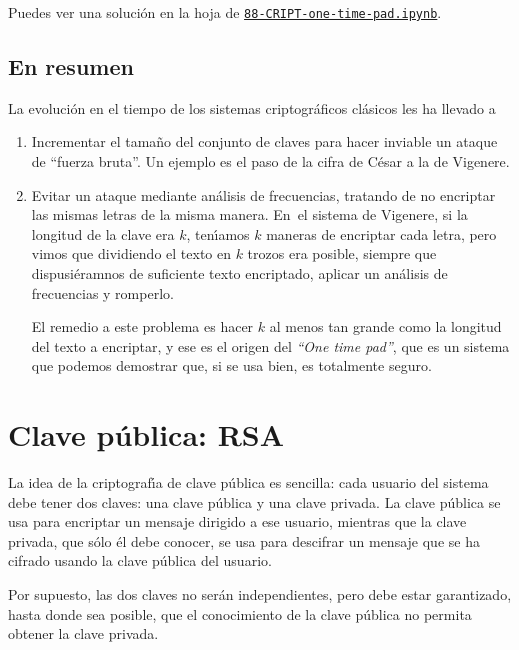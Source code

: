  Puedes ver una soluci\'on en la hoja de {\sage} 
 \href{http://localhost:8888/notebooks/CRIPT/??}{\tt 88-CRIPT-one-time-pad.ipynb}.
 
 \subsection{En resumen}
 
 La evoluci\'on en el tiempo de los sistemas criptogr\'aficos cl\'asicos les ha
llevado a
 \begin{enumerate}
  \item Incrementar el tama\~no del conjunto de claves para
hacer inviable un ataque de ``fuerza bruta''. Un ejemplo es el paso de la cifra
de C\'esar a la  de Vigenere. 

\item Evitar un ataque mediante an\'alisis de frecuencias, tratando de no
encriptar las mismas letras de la misma manera.  En~el sistema de  Vigenere, si
la longitud de la clave era $k$, ten\'{\i}amos $k$ maneras de encriptar cada
letra,  pero vimos que dividiendo el texto en $k$ trozos era posible, siempre
que dispusi\'eramnos de suficiente texto encriptado,  aplicar un an\'alisis de
frecuencias y romperlo.

El remedio a este problema es hacer $k$ al menos tan grande como la longitud del
texto a encriptar, y ese es el origen del {\itshape ``One time pad''}, que es
un sistema que podemos demostrar que, si se usa bien,  es totalmente seguro. 
\end{enumerate}





\section{Clave p\'ublica: RSA}

La idea de la criptograf\'{\i}a de clave p\'ublica es sencilla: cada usuario del
sistema debe tener dos claves: una clave p\'ublica y una clave privada. La clave
p\'ublica se usa para encriptar un mensaje dirigido a ese usuario, mientras que
la clave privada, que s\'olo \'el debe conocer, se usa para descifrar un mensaje
que se ha cifrado usando la clave p\'ublica del usuario.  

Por supuesto, las dos claves no ser\'an independientes, pero debe estar
garantizado, hasta donde sea posible, que el conocimiento de la clave p\'ublica
{\sc no} permita obtener la clave privada. 



